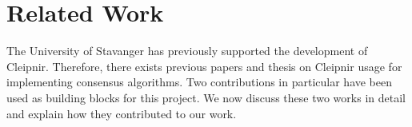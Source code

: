 \chapter{Related Work}
\label{chapter:RW}

The University of Stavanger has previously supported the development of Cleipnir.
Therefore, there exists previous papers and thesis on Cleipnir usage for implementing consensus algorithms.
Two contributions in particular have been used as building blocks for this project. We now discuss these two works in detail and explain how they contributed to our work. 
 
